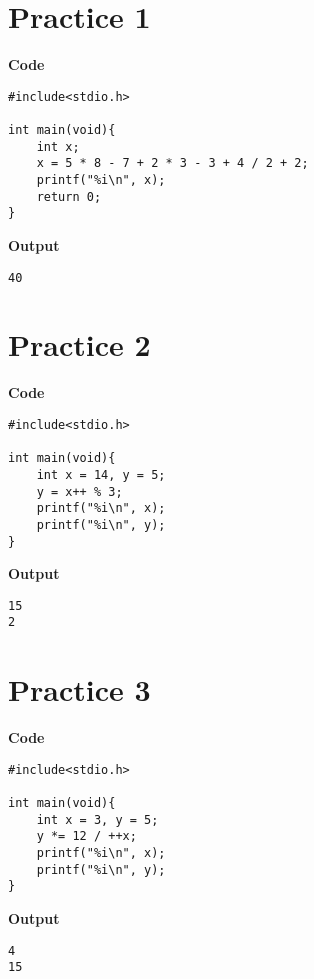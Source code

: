\documentclass[a4paper, 11pt]{article}
\begin{document}
    \section*{Practice 1}
    \begin{minipage}[t]{0.5\textwidth}
        \large \textbf{Code}
        \begin{lstlisting}[style=code]
#include<stdio.h>

int main(void){
    int x;
    x = 5 * 8 - 7 + 2 * 3 - 3 + 4 / 2 + 2;
    printf("%i\n", x);
    return 0;
}
        \end{lstlisting}
    \end{minipage}
    \hspace{0.5cm}
    \begin{minipage}[t]{0.5\textwidth}
        \large \textbf{Output}
        \begin{lstlisting}[style=output]
40
        \end{lstlisting}
    \end{minipage}

    \section*{Practice 2}
    \begin{minipage}[t]{0.5\textwidth}
        \large \textbf{Code}
        \begin{lstlisting}[style=code]
#include<stdio.h>

int main(void){
    int x = 14, y = 5;
    y = x++ % 3;
    printf("%i\n", x);
    printf("%i\n", y);
}
        \end{lstlisting}
    \end{minipage}
    \hspace{0.5cm}
    \begin{minipage}[t]{0.5\textwidth}
        \large \textbf{Output}
        \begin{lstlisting}[style=output]
15
2
        \end{lstlisting}
    \end{minipage}

    \section*{Practice 3}
    \begin{minipage}[t]{0.5\textwidth}
        \large \textbf{Code}
        \begin{lstlisting}[style=code]
#include<stdio.h>

int main(void){
    int x = 3, y = 5;
    y *= 12 / ++x;
    printf("%i\n", x);
    printf("%i\n", y);
}
        \end{lstlisting}
    \end{minipage}
    \hspace{0.5cm}
    \begin{minipage}[t]{0.5\textwidth}
        \large \textbf{Output}
        \begin{lstlisting}[style=output]
4
15
        \end{lstlisting}
    \end{minipage}
\end{document}
